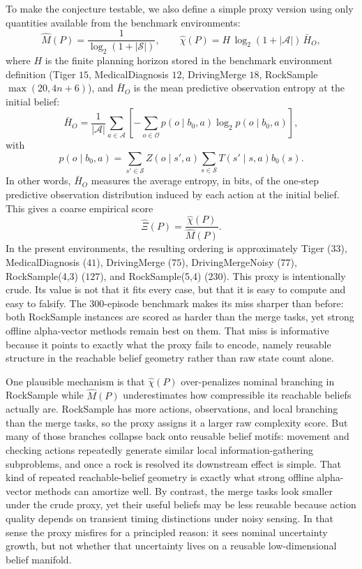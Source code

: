 \documentclass[10pt,twocolumn]{article}
\begin{document}
To make the conjecture testable, we also define a simple proxy version using only quantities available from the benchmark environments:
\begin{equation}
\widehat{M}(P) = \frac{1}{\log_2(1+|\mathcal{S}|)},
\qquad
\widehat{\chi}(P) = H \,\log_2(1+|\mathcal{A}|)\,\bar H_O,
\end{equation}
where $H$ is the finite planning horizon stored in the benchmark environment definition (Tiger $15$, MedicalDiagnosis $12$, DrivingMerge $18$, RockSample $\max(20,4n+6)$), and $\bar H_O$ is the mean predictive observation entropy at the initial belief:
\begin{equation}
\bar H_O = \frac{1}{|\mathcal{A}|}\sum_{a\in\mathcal{A}}
\left[-\sum_{o\in\mathcal{O}} p(o\mid b_0,a)\log_2 p(o\mid b_0,a)\right],
\end{equation}
with
\begin{equation}
p(o\mid b_0,a)=\sum_{s'\in\mathcal{S}} Z(o\mid s',a)\sum_{s\in\mathcal{S}}T(s'\mid s,a)b_0(s).
\end{equation}
In other words, $\bar H_O$ measures the average entropy, in bits, of the one-step predictive observation distribution induced by each action at the initial belief. This gives a coarse empirical score
\begin{equation}
\widehat{\Xi}(P) = \frac{\widehat{\chi}(P)}{\widehat{M}(P)}.
\end{equation}
In the present environments, the resulting ordering is approximately Tiger ($33$), MedicalDiagnosis ($41$), DrivingMerge ($75$), DrivingMergeNoisy ($77$), RockSample(4,3) ($127$), and RockSample(5,4) ($230$). This proxy is intentionally crude. Its value is not that it fits every case, but that it is easy to compute and easy to falsify. The 300-episode benchmark makes its miss sharper than before: both RockSample instances are scored as harder than the merge tasks, yet strong offline alpha-vector methods remain best on them. That miss is informative because it points to exactly what the proxy fails to encode, namely reusable structure in the reachable belief geometry rather than raw state count alone.

One plausible mechanism is that $\widehat{\chi}(P)$ over-penalizes nominal branching in RockSample while $\widehat{M}(P)$ underestimates how compressible its reachable beliefs actually are. RockSample has more actions, observations, and local branching than the merge tasks, so the proxy assigns it a larger raw complexity score. But many of those branches collapse back onto reusable belief motifs: movement and checking actions repeatedly generate similar local information-gathering subproblems, and once a rock is resolved its downstream effect is simple. That kind of repeated reachable-belief geometry is exactly what strong offline alpha-vector methods can amortize well. By contrast, the merge tasks look smaller under the crude proxy, yet their useful beliefs may be less reusable because action quality depends on transient timing distinctions under noisy sensing. In that sense the proxy misfires for a principled reason: it sees nominal uncertainty growth, but not whether that uncertainty lives on a reusable low-dimensional belief manifold.
\end{document}
